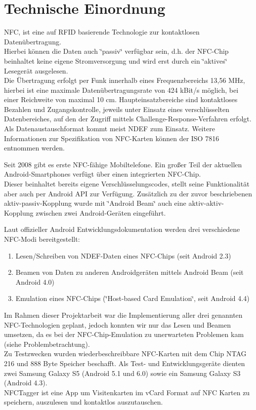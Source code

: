 \documentclass[a4paper,ngerman,12pt]{scrreprt}
\begin{document}
\chapter{Technische Einordnung}

\ac{NFC}, ist eine auf \ac{RFID} basierende Technologie zur kontaktlosen Datenübertragung. \\
Hierbei können die Daten auch \char`\"{}passiv\char`\"{} verfügbar sein, d.h. der NFC-Chip beinhaltet keine eigene Stromversorgung und wird erst durch ein \char`\"{}aktives\char`\"{} Lesegerät ausgelesen. \\
Die Übertragung erfolgt per Funk innerhalb eines Frequenzbereichs 13,56 MHz, hierbei ist eine maximale Datenübertragungsrate von 424 kBit/s möglich, bei einer Reichweite von maximal 10 cm. 
Haupteinsatzbereiche sind kontaktloses Bezahlen und Zugangskontrolle, jeweils unter Einsatz eines verschlüsselten Datenbereiches, auf den der Zugriff mittels Challenge-Response-Verfahren erfolgt. \\
Als Datenaustauschformat kommt meist \ac{NDEF} zum Einsatz. Weitere Informationen zur Spezifikation von NFC-Karten können der ISO 7816 entnommen werden.\newline

Seit 2008 gibt es erste NFC-fähige Mobiltelefone. Ein großer Teil der aktuellen Android-Smartphones verfügt über einen integrierten NFC-Chip. \\
Dieser beinhaltet bereits eigene Verschlüsselungscodes, stellt seine Funktionalität aber auch per Android API zur Verfügung. Zusätzlich zu der zuvor beschriebenen aktiv-passiv-Kopplung wurde mit \char`\"{}Android Beam\char`\"{} auch eine aktiv-aktiv-Kopplung zwischen zwei Android-Geräten eingeführt.

Laut offizieller Android Entwicklungsdokumentation werden drei verschiedene NFC-Modi bereitgestellt:


\begin{enumerate}[-]
\item Lesen/Schreiben von NDEF-Daten eines NFC-Chips (seit Android 2.3)
\item Beamen von Daten zu anderen Androidgeräten mittels Android Beam (seit Android 4.0)
\item Emulation eines NFC-Chips (\char`\"{}Host-based Card Emulation\char`\"{}, seit Android 4.4)
\end{enumerate}

Im Rahmen dieser Projektarbeit war die Implementierung aller drei genannten NFC-Technologien geplant, jedoch konnten wir nur das Lesen und Beamen umsetzen, da es bei der NFC-Chip-Emulation zu unerwarteten Problemen kam (siehe Problembetrachtung).\\ 
Zu Testzwecken wurden wiederbeschreibbare NFC-Karten mit dem Chip NTAG 216 und 888 Byte Speicher beschafft. Als Test- und Entwicklungsgeräte dienten zwei Samsung Galaxy S5 (Android 5.1 und 6.0) sowie ein Samsung Galaxy S3 (Android 4.3). \\
NFCTagger ist eine App um Visitenkarten im vCard Format auf NFC Karten zu speichern, auszulesen und kontaktlos auszutauschen.
\end{document}
